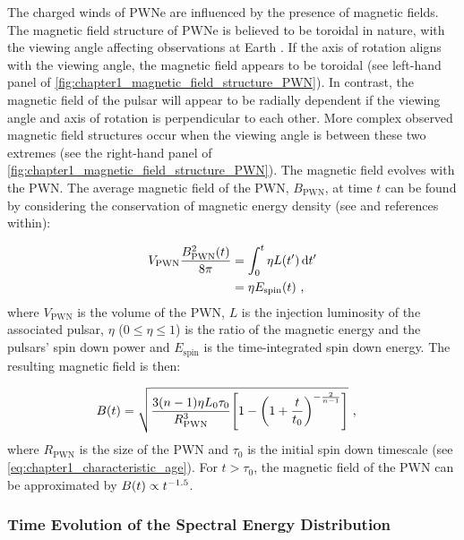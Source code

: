 The charged winds of PWNe are influenced by the presence of magnetic fields. The magnetic field structure of PWNe is believed to be toroidal in nature, with the viewing angle affecting observations at Earth \citep{2006ApJ...638..225K, 2012SSRv..166..231R}. If the axis of rotation aligns with the viewing angle, the magnetic field appears to be toroidal (see left-hand panel of \autoref{fig:chapter1_magnetic_field_structure_PWN}). In contrast, the magnetic field of the pulsar will appear to be radially dependent if the viewing angle and axis of rotation is perpendicular to each other. More complex observed magnetic field structures occur when the viewing angle is between these two extremes (see the right-hand panel of \autoref{fig:chapter1_magnetic_field_structure_PWN}).
\newpar
The magnetic field evolves with the PWN. The average magnetic field of the PWN, $B_\text{PWN}$, at time $t$ can be found by considering the conservation of magnetic energy density (see \cite{2010ApJ...715.1248T} and references within):

\begin{equation}
    \begin{aligned}
    V_\text{PWN}\frac{B^2_\text{PWN}\qty(t)}{8\pi}&=\int_0^t\eta L\qty(t')\dd{t'} \\
    &=\eta E_\text{spin}\qty(t)\text{ ,}
    \end{aligned} \label{eq:chapter_1_mag  fnetic_conservation_energy}
\end{equation}
\noindent where $V_\text{PWN}$ is the volume of the PWN, $L$ is the injection luminosity of the associated pulsar, $\eta$ ($0\leq\eta\leq 1$) is the ratio of the magnetic energy and the pulsars' spin down power and $E_\text{spin}$ is the time-integrated spin down energy. The resulting magnetic field is then:

\begin{equation}
    \begin{aligned}
    B\qty(t)&=\sqrt{\frac{3\qty(n-1)\eta L_0\tau_0}{R^3_\text{PWN}}\qty[1-\qty(1+\frac{t}{t_0})^{-\frac{2}{n-1}}]}\text{ ,}
    \end{aligned} \label{eq:chapter_1_magnetic_field_ev}
\end{equation}
\noindent where $R_\text{PWN}$ is the size of the PWN and $\tau_0$ is the initial spin down timescale (see \autoref{eq:chapter1_characteristic_age}). For $t>\tau_0$, the magnetic field of the PWN can be approximated by $B\qty(t)\propto t^{-1.5}$.

\subsubsection{Time Evolution of the Spectral Energy Distribution}

